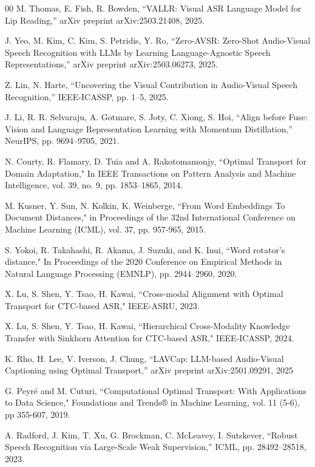 \documentclass[conference]{IEEEtran}
\begin{document}
\begin{thebibliography}{00}
M. Thomas, E. Fish, R. Bowden, ``VALLR: Visual ASR Language Model for Lip Reading,'' arXiv preprint arXiv:2503.21408, 2025.

J. Yeo, M. Kim, C. Kim, S. Petridis, Y. Ro, ``Zero-AVSR: Zero-Shot Audio-Visual Speech Recognition with LLMs by Learning Language-Agnostic Speech Representations,'' arXiv preprint arXiv:2503.06273, 2025.
	
Z. Lin, N. Harte, ``Uncovering the Visual Contribution in Audio-Visual Speech Recognition,'' IEEE-ICASSP, pp. 1--5, 2025.

J. Li, R. R. Selvaraju, A. Gotmare, S. Joty, C. Xiong, S. Hoi, ``Align before Fuse: Vision and Language Representation Learning with Momentum Distillation,'' NeurIPS, pp. 9694--9705, 2021.
	
N. Courty, R. Flamary, D. Tuia and A. Rakotomamonjy, ``Optimal Transport for Domain Adaptation," In IEEE Transactions on Pattern Analysis and Machine Intelligence, vol. 39, no. 9, pp. 1853--1865, 2014.
 
M. Kusner, Y. Sun, N. Kolkin, K. Weinberge, ``From Word Embeddings To Document Distances," in Proceedings of the 32nd International Conference on Machine Learning (ICML), vol. 37, pp. 957-965, 2015.

S. Yokoi, R. Takahashi, R. Akama, J. Suzuki, and K. Inui, ``Word rotator’s distance," In Proceedings of the 2020 Conference on Empirical Methods in Natural Language Processing (EMNLP), pp. 2944--2960, 2020.

X. Lu, S. Shen, Y. Tsao, H. Kawai, ``Cross-modal Alignment with Optimal Transport for CTC-based ASR," IEEE-ASRU, 2023.

X. Lu, S. Shen, Y. Tsao, H. Kawai, ``Hierarchical Cross-Modality Knowledge Transfer with Sinkhorn Attention for CTC-based ASR," IEEE-ICASSP, 2024.

K. Rho, H. Lee, V. Iverson, J. Chung, ``LAVCap: LLM-based Audio-Visual Captioning using Optimal Transport,'' arXiv preprint arXiv:2501.09291, 2025

G. Peyr{\'e} and M. Cuturi, ``Computational Optimal Transport: With Applications to Data Science," Foundations and Trends® in Machine Learning, vol. 11 (5-6), pp 355-607, 2019.

A. Radford, J. Kim, T. Xu, G. Brockman, C. McLeavey, I. Sutskever, ``Robust Speech Recognition via Large-Scale Weak Supervision,'' ICML, pp. 28492--28518, 2023.


\end{thebibliography}
\end{document}
